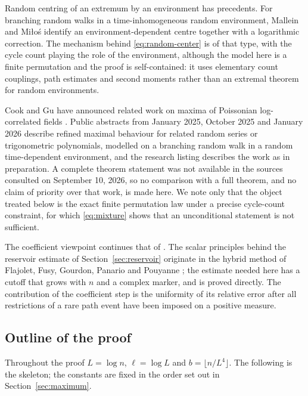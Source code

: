 \documentclass[11pt]{article}
\theoremstyle{definition}\newtheorem{definition}[theorem]{Definition}
\theoremstyle{remark}\newtheorem{remark}[theorem]{Remark}
\numberwithin{equation}{section}\allowdisplaybreaks
\begin{document}
Random centring of an extremum by an environment has precedents. For
branching random walks in a time-inhomogeneous random environment,
Mallein and Mi\l o\'s \cite{MM} identify an environment-dependent centre
together with a logarithmic correction. The mechanism behind
\eqref{eq:random-center} is of that type, with the cycle count playing
the role of the environment, although the model here is a finite
permutation and the proof is self-contained: it uses elementary count
couplings, path estimates and second moments rather than an extremal
theorem for random environments.

Cook and Gu have announced related work on maxima of Poissonian
log-correlated fields \cite{CG}. Public abstracts from January 2025,
October 2025 and January 2026 describe refined maximal behaviour for
related random series or trigonometric polynomials, modelled on a
branching random walk in a random time-dependent environment, and the
research listing describes the work as in preparation. A complete
theorem statement was not available in the sources consulted on
September 10, 2026, so no comparison with a full theorem, and no claim
of priority over that work, is made here. We note only that the object
treated below is the exact finite permutation law under a precise
cycle-count constraint, for which \eqref{eq:mixture} shows that an
unconditional statement is not sufficient.

The coefficient viewpoint continues that of \cite{Lu}. The scalar
principles behind the reservoir estimate of Section~\ref{sec:reservoir}
originate in the hybrid method of Flajolet, Fusy, Gourdon, Panario and
Pouyanne \cite{FFGPP}; the estimate needed here has a cutoff that grows
with $n$ and a complex marker, and is proved directly. The contribution
of the coefficient step is the uniformity of its relative error after
all restrictions of a rare path event have been imposed on a positive
measure.

\subsection{Outline of the proof}\label{subsec:outline}

Throughout the proof $L=\log n$, $\ell=\log L$ and $b=\lfloor
n/L^4\rfloor$. The following is the skeleton; the constants are fixed in
the order set out in Section~\ref{sec:maximum}.
\end{document}
